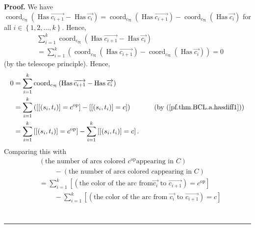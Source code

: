 \documentclass
[numbers=enddot,12pt,final,onecolumn,notitlepage,abstracton]{scrartcl}%
\theoremstyle{definition}
\newenvironment{proof}[1][Proof]{\noindent\textbf{#1.} }{\ \rule{0.5em}{0.5em}}
\let\sumnonlimits\sum
\renewcommand{\sum}{\sumnonlimits\limits}
\begin{document}
\begin{proof}
We have $\operatorname*{coord}\nolimits_{c_{\mathfrak{N}}}\left(
\operatorname*{Has}\overrightarrow{c_{i+1}}-\operatorname*{Has}%
\overrightarrow{c_{i}}\right)  =\operatorname*{coord}%
\nolimits_{c_{\mathfrak{N}}}\left(  \operatorname*{Has}\overrightarrow{c_{i+1}%
}\right)  -\operatorname*{coord}\nolimits_{c_{\mathfrak{N}}}\left(
\operatorname*{Has}\overrightarrow{c_{i}}\right)  $ for all $i\in\left\{
1,2,\ldots,k\right\}  $. Hence,%
\begin{align*}
&  \sum_{i=1}^{k}\operatorname*{coord}\nolimits_{c_{\mathfrak{N}}}\left(
\operatorname*{Has}\overrightarrow{c_{i+1}}-\operatorname*{Has}%
\overrightarrow{c_{i}}\right) \\
&  =\sum_{i=1}^{k}\left(  \operatorname*{coord}\nolimits_{c_{\mathfrak{N}}%
}\left(  \operatorname*{Has}\overrightarrow{c_{i+1}}\right)
-\operatorname*{coord}\nolimits_{c_{\mathfrak{N}}}\left(  \operatorname*{Has}%
\overrightarrow{c_{i}}\right)  \right)  =0
\end{align*}
(by the telescope principle). Hence,%
\begin{align*}
0  &  =\sum_{i=1}^{k}\operatorname*{coord}\nolimits_{c_{\mathfrak{N}}}\left(
\operatorname*{Has}\overrightarrow{c_{i+1}}-\operatorname*{Has}%
\overrightarrow{c_{i}}\right) \\
&  =\sum_{i=1}^{k}\left(  \left[  \left[  \left(  s_{i},t_{i}\right)  \right]
=c^{\operatorname*{op}}\right]  -\left[  \left[  \left(  s_{i},t_{i}\right)
\right]  =c\right]  \right)  \ \ \ \ \ \ \ \ \ \ \left(  \text{by
(\ref{pf.thm.BCL.a.hasdiff1})}\right) \\
&  =\sum_{i=1}^{k}\left[  \left[  \left(  s_{i},t_{i}\right)  \right]
=c^{\operatorname*{op}}\right]  -\sum_{i=1}^{k}\left[  \left[  \left(
s_{i},t_{i}\right)  \right]  =c\right]  .
\end{align*}
Comparing this with%
\begin{align*}
&  \left(  \text{the number of arcs colored }c^{\operatorname*{op}}\text{
appearing in }C\right) \\
&  \ \ \ \ \ \ \ \ \ \ -\left(  \text{the number of arcs colored }c\text{
appearing in }C\right) \\
&  =\sum_{i=1}^{k}\left[  \left(  \text{the color of the arc from
}\overrightarrow{c_{i}}\text{ to }\overrightarrow{c_{i+1}}\right)
=c^{\operatorname*{op}}\right] \\
&  \ \ \ \ \ \ \ \ \ \ -\sum_{i=1}^{k}\left[  \left(  \text{the color of the
arc from }\overrightarrow{c_{i}}\text{ to }\overrightarrow{c_{i+1}}\right)
=c\right] \\

\end{align*}
\end{proof}
\end{document}
